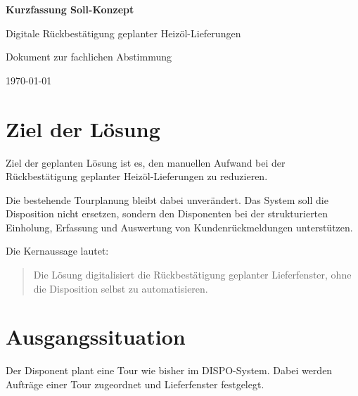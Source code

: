 \documentclass[12pt,a4paper]{article}
\begin{document}
	
	\begin{titlepage}
		\centering
		\vspace*{3cm}
		
		{\Huge\bfseries Kurzfassung Soll-Konzept\par}
		\vspace{1cm}
		
		{\LARGE Digitale Rückbestätigung geplanter Heizöl-Lieferungen\par}
		\vspace{2cm}
		
		{\large Dokument zur fachlichen Abstimmung\par}
		
		\vfill
		
		{\large \today\par}
	\end{titlepage}
	
	\tableofcontents
	\newpage
	
	\section{Ziel der Lösung}
	
	Ziel der geplanten Lösung ist es, den manuellen Aufwand bei der Rückbestätigung geplanter Heizöl-Lieferungen zu reduzieren.
	
	Die bestehende Tourplanung bleibt dabei unverändert. Das System soll die Disposition nicht ersetzen, sondern den Disponenten bei der strukturierten Einholung, Erfassung und Auswertung von Kundenrückmeldungen unterstützen.
	
	Die Kernaussage lautet:
	
	\begin{quote}
		Die Lösung digitalisiert die Rückbestätigung geplanter Lieferfenster, ohne die Disposition selbst zu automatisieren.
	\end{quote}
	
	\section{Ausgangssituation}
	
	Der Disponent plant eine Tour wie bisher im DISPO-System. Dabei werden Aufträge einer Tour zugeordnet und Lieferfenster festgelegt.
	
\end{document}

